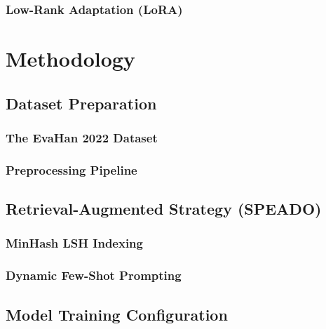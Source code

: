 \subsection{Low-Rank Adaptation (LoRA)}

\chapter{Methodology}

\section{Dataset Preparation}
\subsection{The EvaHan 2022 Dataset}

\subsection{Preprocessing Pipeline}

\section{Retrieval-Augmented Strategy (SPEADO)} 
\subsection{MinHash LSH Indexing}
\subsection{Dynamic Few-Shot Prompting}

\section{Model Training Configuration}

